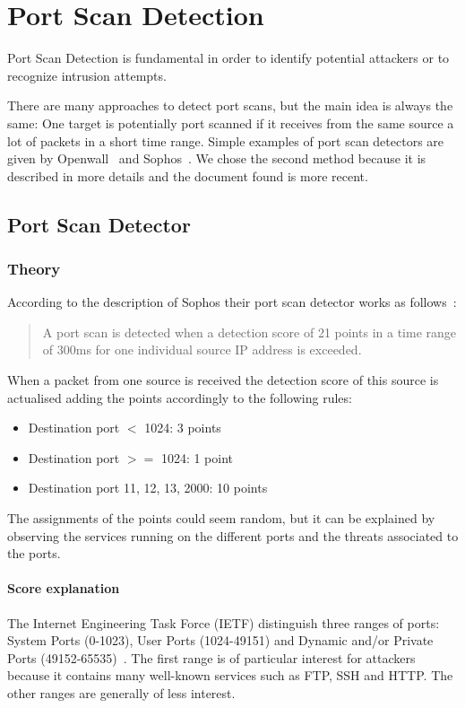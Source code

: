 \chapter{Port Scan Detection}
\label{sec:detector}
Port Scan Detection is fundamental in order
to identify potential attackers or to recognize intrusion attempts.

There are many approaches to detect port scans, but the main idea
is always the same: One target is potentially port scanned if it receives
from the same source a lot of packets in a short time range.
Simple examples of port scan detectors are given by 
Openwall~\cite{scanlogd} and Sophos~\cite{sophos}.
We chose the second method because it is described in more details and the document found
is more recent.






\section{Port Scan Detector}


\subsection{Theory}
\label{subsec:detector:theory}
According to the description of Sophos their port scan detector works as follows~\cite{sophos}:
\begin{quote}
	A port scan is detected when a detection score of 21 points
	in a time range of 300ms for one individual source IP address is exceeded.
\end{quote}
When a packet from one source is received the detection score of this source
is actualised adding the points accordingly to the following rules:
\begin{itemize}
	\item Destination port $<$ 1024: 3 points
	\item Destination port $>=$ 1024: 1 point
	\item Destination port 11, 12, 13, 2000: 10 points
\end{itemize}
The assignments of the points could seem random, but it can be explained by observing the services running on the different ports and the threats associated to the ports.



\subsubsection{Score explanation}
The Internet Engineering Task Force (IETF) distinguish three ranges of ports: System Ports (0-1023), 
User Ports (1024-49151) and Dynamic and/or Private Ports (49152-65535)~\cite{rfc6335}.
The first range is of particular interest for attackers because it contains many well-known services such as FTP, SSH and HTTP.
The other ranges are generally of less interest.


